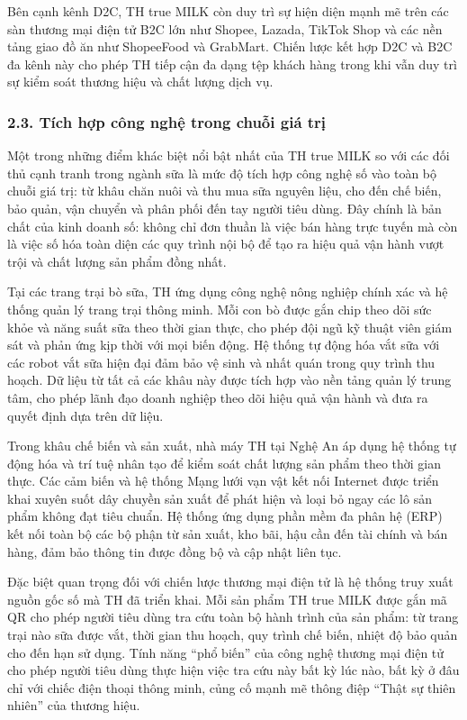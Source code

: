 Bên cạnh kênh D2C, TH true MILK còn duy trì sự hiện diện mạnh mẽ trên
các sàn thương mại điện tử B2C lớn như Shopee, Lazada, TikTok Shop và
các nền tảng giao đồ ăn như ShopeeFood và GrabMart. Chiến lược kết hợp
D2C và B2C đa kênh này cho phép TH tiếp cận đa dạng tệp khách hàng trong
khi vẫn duy trì sự kiểm soát thương hiệu và chất lượng dịch vụ.

\subsubsection{\texorpdfstring{2.3. Tích hợp công nghệ trong chuỗi giá
trị
}{2.3. Tích hợp công nghệ trong chuỗi giá trị }}\label{tuxedch-hux1ee3p-cuxf4ng-nghux1ec7-trong-chuux1ed7i-giuxe1-trux1ecb}

Một trong những điểm khác biệt nổi bật nhất của TH true MILK so với các
đối thủ cạnh tranh trong ngành sữa là mức độ tích hợp công nghệ số vào
toàn bộ chuỗi giá trị: từ khâu chăn nuôi và thu mua sữa nguyên liệu, cho
đến chế biến, bảo quản, vận chuyển và phân phối đến tay người tiêu dùng.
Đây chính là bản chất của kinh doanh số: không chỉ đơn thuần là việc bán
hàng trực tuyến mà còn là việc số hóa toàn diện các quy trình nội bộ để
tạo ra hiệu quả vận hành vượt trội và chất lượng sản phẩm đồng nhất.

Tại các trang trại bò sữa, TH ứng dụng công nghệ nông nghiệp chính xác
và hệ thống quản lý trang trại thông minh. Mỗi con bò được gắn chip theo
dõi sức khỏe và năng suất sữa theo thời gian thực, cho phép đội ngũ kỹ
thuật viên giám sát và phản ứng kịp thời với mọi biến động. Hệ thống tự
động hóa vắt sữa với các robot vắt sữa hiện đại đảm bảo vệ sinh và nhất
quán trong quy trình thu hoạch. Dữ liệu từ tất cả các khâu này được tích
hợp vào nền tảng quản lý trung tâm, cho phép lãnh đạo doanh nghiệp theo
dõi hiệu quả vận hành và đưa ra quyết định dựa trên dữ liệu.

Trong khâu chế biến và sản xuất, nhà máy TH tại Nghệ An áp dụng hệ thống
tự động hóa và trí tuệ nhân tạo để kiểm soát chất lượng sản phẩm theo
thời gian thực. Các cảm biến và hệ thống Mạng lưới vạn vật kết nối
Internet được triển khai xuyên suốt dây chuyền sản xuất để phát hiện và
loại bỏ ngay các lô sản phẩm không đạt tiêu chuẩn. Hệ thống ứng dụng
phần mềm đa phân hệ (ERP) kết nối toàn bộ các bộ phận từ sản xuất, kho
bãi, hậu cần đến tài chính và bán hàng, đảm bảo thông tin được đồng bộ
và cập nhật liên tục.

Đặc biệt quan trọng đối với chiến lược thương mại điện tử là hệ thống
truy xuất nguồn gốc số mà TH đã triển khai. Mỗi sản phẩm TH true MILK
được gắn mã QR cho phép người tiêu dùng tra cứu toàn bộ hành trình của
sản phẩm: từ trang trại nào sữa được vắt, thời gian thu hoạch, quy trình
chế biến, nhiệt độ bảo quản cho đến hạn sử dụng. Tính năng ``phổ biến''
của công nghệ thương mại điện tử cho phép người tiêu dùng thực hiện việc
tra cứu này bất kỳ lúc nào, bất kỳ ở đâu chỉ với chiếc điện thoại thông
minh, củng cố mạnh mẽ thông điệp ``Thật sự thiên nhiên'' của thương
hiệu.

